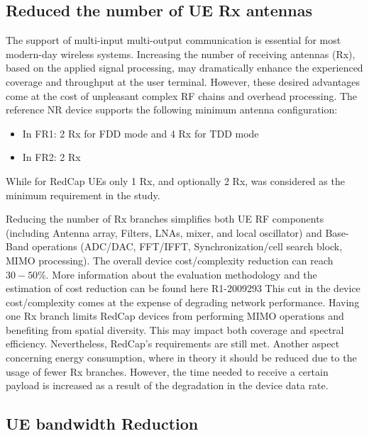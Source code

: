 \documentclass[]{IEEEtran}
\begin{document}
\subsection{Reduced the number of UE Rx antennas}
\label{sec:4-1}

The support of multi-input multi-output communication is essential for most modern-day wireless systems. Increasing the number of receiving antennas (Rx), based on the applied signal processing, may dramatically enhance the experienced coverage and throughput at the user terminal. However, these desired advantages come at the cost of unpleasant complex RF chains and overhead processing. The reference NR device supports the following minimum antenna configuration:
\begin{itemize}
    \item In FR1: 2 Rx for FDD mode and 4 Rx for TDD mode
    \item In FR2: 2 Rx
\end{itemize}
While for RedCap UEs only 1 Rx, and optionally 2 Rx, was considered as the minimum requirement in the study.

Reducing the number of Rx branches simplifies both UE RF components (including Antenna array, Filters, LNAs, mixer, and local oscillator) and Base-Band operations (ADC/DAC, FFT/IFFT, Synchronization/cell search block, MIMO processing). The overall device cost/complexity reduction can reach $30-50\%$. More information about the evaluation methodology and the estimation of cost reduction can be found here R1-2009293 \cite{3gpp.R1-2009293}
This cut in the device cost/complexity comes at the expense of degrading network performance. Having one Rx branch limits RedCap devices from performing MIMO operations and benefiting from spatial diversity. This may impact both coverage and spectral efficiency. Nevertheless, RedCap's requirements are still met. Another aspect concerning energy consumption, where in theory it should be reduced due to the usage of fewer Rx branches. However, the time needed to receive a certain payload is increased as a result of the degradation in the device data rate.

\subsection{UE bandwidth Reduction}
\label{sec:4-2}
\end{document}
